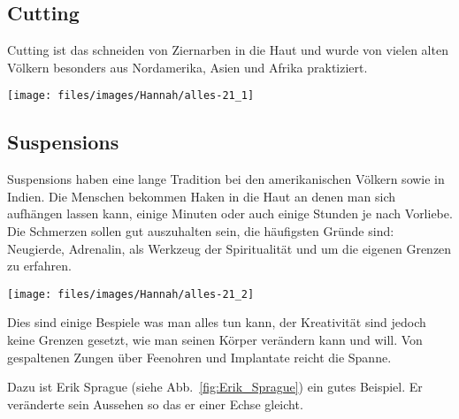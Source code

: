 \subsection{Cutting}
Cutting ist das schneiden von Ziernarben in die Haut und wurde von vielen alten Völkern besonders aus
Nordamerika, Asien und Afrika praktiziert.

\begin{figurewrapper}
	\texttt{[image: files/images/Hannah/alles-21\_1]}%
\end{figurewrapper}

\subsection{Suspensions}
Suspensions haben eine lange Tradition bei den amerikanischen Völkern sowie in Indien. Die Menschen
bekommen Haken in die Haut an denen man sich aufhängen lassen kann, einige Minuten oder auch einige
Stunden je nach Vorliebe. Die Schmerzen sollen gut auszuhalten sein, die häufigsten Gründe sind:
Neugierde, Adrenalin, als Werkzeug der Spiritualität und um die eigenen Grenzen zu erfahren.

\begin{figurewrapper}
	\texttt{[image: files/images/Hannah/alles-21\_2]}%
\end{figurewrapper}

Dies sind einige Bespiele was man alles tun kann, der Kreativität sind jedoch keine Grenzen gesetzt,
wie man seinen Körper verändern kann und will. Von gespaltenen Zungen über Feenohren und Implantate
reicht die Spanne.

Dazu ist Erik Sprague (siehe Abb.~\vref{fig:Erik_Sprague}) ein gutes
Beispiel. Er veränderte sein Aussehen so das er einer Echse gleicht.


\begin{figurewrapper}
	 \hfill
	\caption{???}
\end{figurewrapper}

\begin{figurewrapper}
	 \hfill
	\caption{???}
\end{figurewrapper}

